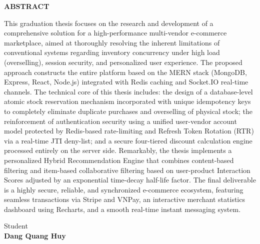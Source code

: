 \documentclass[../DoAn.tex]{subfiles}
\begin{document}
\begin{center}
    \Large{\textbf{ABSTRACT}}\\
\end{center}
\vspace{1cm}

This graduation thesis focuses on the research and development of a comprehensive solution for a high-performance multi-vendor e-commerce marketplace, aimed at thoroughly resolving the inherent limitations of conventional systems regarding inventory concurrency under high load (overselling), session security, and personalized user experience. The proposed approach constructs the entire platform based on the MERN stack (MongoDB, Express, React, Node.js) integrated with Redis caching and Socket.IO real-time channels. The technical core of this thesis includes: the design of a database-level atomic stock reservation mechanism incorporated with unique idempotency keys to completely eliminate duplicate purchases and overselling of physical stock; the reinforcement of authentication security using a unified user-vendor account model protected by Redis-based rate-limiting and Refresh Token Rotation (RTR) via a real-time JTI deny-list; and a secure four-tiered discount calculation engine processed entirely on the server side. Remarkably, the thesis implements a personalized Hybrid Recommendation Engine that combines content-based filtering and item-based collaborative filtering based on user-product Interaction Scores adjusted by an exponential time-decay half-life factor. The final deliverable is a highly secure, reliable, and synchronized e-commerce ecosystem, featuring seamless transactions via Stripe and VNPay, an interactive merchant statistics dashboard using Recharts, and a smooth real-time instant messaging system.

\begin{flushright}
Student\\
\vspace{1.5cm}
\textbf{Dang Quang Huy}
\end{flushright}
\end{document}
